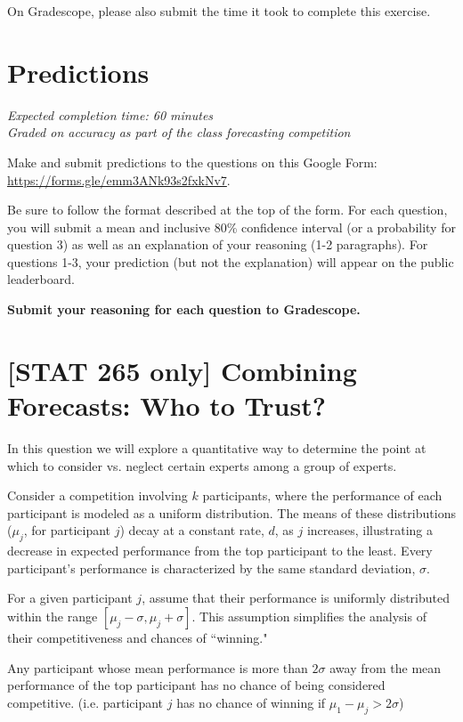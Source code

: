 \documentclass[11pt]{article}
\begin{document}
On Gradescope, please also submit the time it took to complete this exercise.

\section*{Predictions} 

\emph{Expected completion time: 60 minutes} \\
\emph{Graded on accuracy as part of the class forecasting competition}

Make and submit predictions to the questions on this Google Form: \\ \url{https://forms.gle/emm3ANk93s2fxkNv7}.

Be sure to follow the format
described at the top of the form.
For each question, you will submit a mean and inclusive 80\% confidence interval (or a probability
for question 3) as well as an explanation of your reasoning (1-2 paragraphs).
For questions 1-3, your prediction (but not the explanation) will appear on the public leaderboard.

\textbf{Submit your reasoning for each question to Gradescope.}


\newpage
\section*{[STAT 265 only] Combining Forecasts: Who to Trust?}
In this question we will explore a quantitative way to determine the point at which to consider vs. neglect certain experts among a group of experts.

Consider a competition involving \(k\) participants, where the performance of each participant is modeled as a uniform distribution. The means of these distributions (\(\mu_j\), for participant \(j\)) decay at a constant rate, $d$, as \(j\) increases, illustrating a decrease in expected performance from the top participant to the least. Every participant's performance is characterized by the same standard deviation, \(\sigma\).

For a given participant \(j\), assume that their performance is uniformly distributed within the range \([\mu_j - \sigma, \mu_j + \sigma]\). This assumption simplifies the analysis of their competitiveness and chances of ``winning."

Any participant whose mean performance is more than \(2\sigma\) away from the mean performance of the top participant has no chance of being considered competitive. (i.e. participant $j$ has no chance of winning if \(\mu_1 - \mu_j > 2\sigma\))
\end{document}

